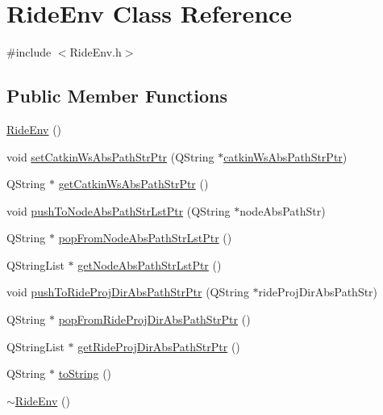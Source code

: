\hypertarget{class_ride_env}{\section{Ride\-Env Class Reference}
\label{class_ride_env}
}


{\ttfamily \#include $<$Ride\-Env.\-h$>$}

\subsection*{Public Member Functions}
\begin{DoxyCompactItemize}
\item 
\hyperlink{class_ride_env_a6229a6564da7aed3bc7f01a8c6d5d30a}{Ride\-Env} ()
\item 
void \hyperlink{class_ride_env_a126b8ac5bc6dd2b0ca109758b1db9bc6}{set\-Catkin\-Ws\-Abs\-Path\-Str\-Ptr} (Q\-String $\ast$\hyperlink{class_ride_env_a3f048e5d036e957c7776f1e31c648b41}{catkin\-Ws\-Abs\-Path\-Str\-Ptr})
\item 
Q\-String $\ast$ \hyperlink{class_ride_env_aefaa312abdea240e659ca8fda26e1977}{get\-Catkin\-Ws\-Abs\-Path\-Str\-Ptr} ()
\item 
void \hyperlink{class_ride_env_aba2d2d0061340150e6246a6c64f319c6}{push\-To\-Node\-Abs\-Path\-Str\-Lst\-Ptr} (Q\-String $\ast$node\-Abs\-Path\-Str)
\item 
Q\-String $\ast$ \hyperlink{class_ride_env_a76e027be4d88b381619e7dd215fbe6e8}{pop\-From\-Node\-Abs\-Path\-Str\-Lst\-Ptr} ()
\item 
Q\-String\-List $\ast$ \hyperlink{class_ride_env_af1c2c75b9cd3cb86cc2dc59f3ad3320d}{get\-Node\-Abs\-Path\-Str\-Lst\-Ptr} ()
\item 
void \hyperlink{class_ride_env_af33b92e6b30bf486f40cf50ac0436386}{push\-To\-Ride\-Proj\-Dir\-Abs\-Path\-Str\-Ptr} (Q\-String $\ast$ride\-Proj\-Dir\-Abs\-Path\-Str)
\item 
Q\-String $\ast$ \hyperlink{class_ride_env_a4bdc02eec0f8db43b0d8da4bfd34cece}{pop\-From\-Ride\-Proj\-Dir\-Abs\-Path\-Str\-Ptr} ()
\item 
Q\-String\-List $\ast$ \hyperlink{class_ride_env_a5dffe5335f27d00972f15afc942990ea}{get\-Ride\-Proj\-Dir\-Abs\-Path\-Str\-Ptr} ()
\item 
Q\-String $\ast$ \hyperlink{class_ride_env_a535f35f5a22ea7aa14d902c85745f0a2}{to\-String} ()
\item 
\hyperlink{class_ride_env_ae30c54432b90b1208f5085730fa1ec3d}{$\sim$\-Ride\-Env} ()
\end{DoxyCompactItemize}
